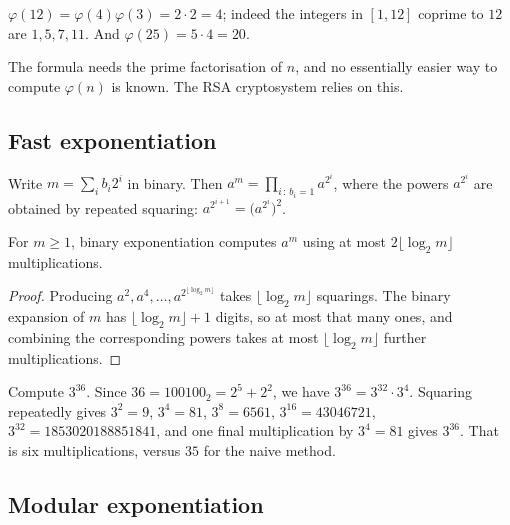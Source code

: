\begin{example}
$\varphi(12)=\varphi(4)\varphi(3)=2\cdot2=4$; indeed the integers in $[1,12]$ coprime to $12$ are $1,5,7,11$. And $\varphi(25)=5\cdot4=20$.
\end{example}

\begin{note}
The formula needs the prime factorisation of $n$, and no essentially easier way to compute $\varphi(n)$ is known. The RSA cryptosystem relies on this.
\end{note}

\subsection{Fast exponentiation}
\label{sec:7-13}

\begin{definition}
Write $m=\sum_{i}b_i2^i$ in binary. Then $a^m=\prod_{i \,:\, b_i=1}a^{2^i}$, where the powers $a^{2^i}$ are obtained by repeated squaring: $a^{2^{i+1}}=\bigl(a^{2^i}\bigr)^2$.
\end{definition}

\begin{proposition}[Cost]
\label{thm:fastexpcost}
For $m\ge1$, binary exponentiation computes $a^m$ using at most $2\lfloor\log_2 m\rfloor$ multiplications.
\end{proposition}
\begin{proof}
Producing $a^2,a^4,\dots,a^{2^{\lfloor\log_2m\rfloor}}$ takes $\lfloor\log_2m\rfloor$ squarings. The binary expansion of $m$ has $\lfloor\log_2m\rfloor+1$ digits, so at most that many ones, and combining the corresponding powers takes at most $\lfloor\log_2m\rfloor$ further multiplications.
\end{proof}

\begin{example}
Compute $3^{36}$. Since $36=100100_2=2^5+2^2$, we have $3^{36}=3^{32}\cdot3^4$. Squaring repeatedly gives $3^2=9$, $3^4=81$, $3^8=6561$, $3^{16}=43046721$, $3^{32}=1853020188851841$, and one final multiplication by $3^4=81$ gives $3^{36}$. That is six multiplications, versus $35$ for the naive method.
\end{example}

\subsection{Modular exponentiation}
\label{sec:7-14}

